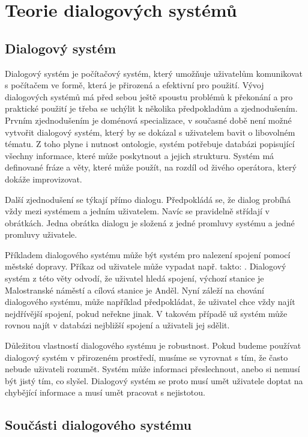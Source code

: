 \chapter{Teorie dialogových systémů}
\label{ch:kap1}

\section{Dialogový systém}

Dialogový systém je počítačový systém, který umožňuje uživatelům komunikovat s počítačem ve formě, která je přirozená a efektivní pro použití.
Vývoj dialogových systémů má před sebou ještě spoustu problémů k překonání a pro praktické použití je třeba se uchýlit k několika předpokladům a zjednodušením.
Prvním zjednodušením je doménová specializace, v současné době není možné vytvořit dialogový systém, který by se dokázal s uživatelem bavit o libovolném tématu.
Z toho plyne i nutnost ontologie, systém potřebuje databázi popisující všechny informace, které může poskytnout a jejich strukturu.
Systém má definované fráze a věty, které může použít, na rozdíl od živého operátora, který dokáže improvizovat.

Další zjednodušení se týkají přímo dialogu.
Předpokládá se, že dialog probíhá vždy mezi systémem a jedním uživatelem.
Navíc se pravidelně střídají v obrátkách.
Jedna obrátka dialogu je složená z jedné promluvy systému a jedné promluvy uživatele.

Příkladem dialogového systému může být systém pro nalezení spojení pomocí městské dopravy.
Příkaz od uživatele může vypadat např. takto: .
Dialogový systém z této věty odvodí, že uživatel hledá spojení, výchozí stanice je Malostranské náměstí a cílová stanice je Anděl.
Nyní záleží na chování dialogového systému, může například předpokládat, že uživatel chce vždy najít nejdřívější spojení, pokud neřekne jinak.
V takovém případě už systém může rovnou najít v databázi nejbližší spojení a uživateli jej sdělit.

Důležitou vlastností dialogového systému je robustnost.
Pokud budeme používat dialogový systém v přirozeném prostředí, musíme se vyrovnat s tím, že často nebude uživateli rozumět.
Systém může informaci přeslechnout, anebo si nemusí být jistý tím, co slyšel.
Dialogový systém se proto musí umět uživatele doptat na chybějící informace a musí umět pracovat s nejistotou.

\section{Součásti dialogového systému}

